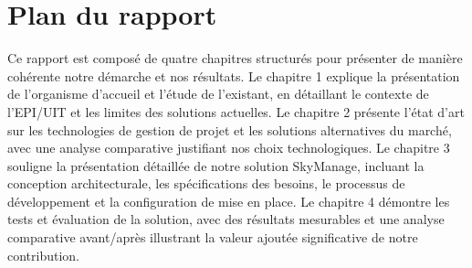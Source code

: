 \section*{Plan du rapport}

Ce rapport est composé de quatre chapitres structurés pour présenter de manière cohérente notre démarche et nos résultats. Le chapitre 1 explique la présentation de l'organisme d'accueil et l'étude de l'existant, en détaillant le contexte de l'EPI/UIT et les limites des solutions actuelles. Le chapitre 2 présente l'état d'art sur les technologies de gestion de projet et les solutions alternatives du marché, avec une analyse comparative justifiant nos choix technologiques. Le chapitre 3 souligne la présentation détaillée de notre solution SkyManage, incluant la conception architecturale, les spécifications des besoins, le processus de développement et la configuration de mise en place. Le chapitre 4 démontre les tests et évaluation de la solution, avec des résultats mesurables et une analyse comparative avant/après illustrant la valeur ajoutée significative de notre contribution.
